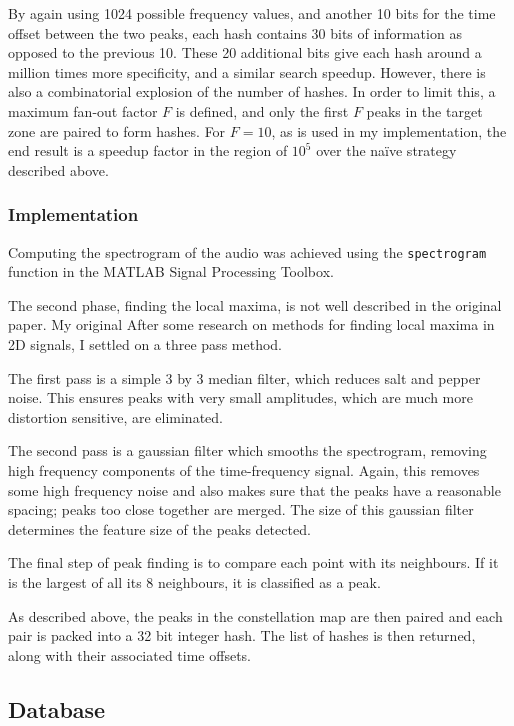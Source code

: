 \documentclass[12pt,a4paper,twoside,openright]{report}
\begin{document}
By again using 1024 possible frequency values, and another 10 bits for the time offset between the two peaks, each hash contains 30 bits of information as opposed to the previous 10. These 20 additional bits give each hash around a million times more specificity, and a similar search speedup. However, there is also a combinatorial explosion of the number of hashes. In order to limit this, a maximum fan-out factor $F$ is defined, and only the first $F$ peaks in the target zone are paired to form hashes. For $F=10$, as is used in my implementation, the end result is a speedup factor in the region of $10^5$ over the na{\"i}ve strategy described above.

\subsubsection{Implementation}

Computing the spectrogram of the audio was achieved using the \lstinline{spectrogram} function in the MATLAB Signal Processing Toolbox.

The second phase, finding the local maxima, is not well described in the original paper. My original After some research on methods for finding local maxima in 2D signals, I settled on a three pass method. 

The first pass is a simple 3 by 3 median filter, which reduces salt and pepper noise. This ensures peaks with very small amplitudes, which are much more distortion sensitive, are eliminated. 

The second pass is a gaussian filter which smooths the spectrogram, removing high frequency components of the time-frequency signal. Again, this removes some high frequency noise and also makes sure that the peaks have a reasonable spacing; peaks too close together are merged. The size of this gaussian filter determines the feature size of the peaks detected. 

The final step of peak finding is to compare each point with its neighbours. If it is the largest of all its 8 neighbours, it is classified as a peak.

As described above, the peaks in the constellation map are then paired and each pair is packed into a 32 bit integer hash. The list of hashes is then returned, along with their associated time offsets.


\subsection{Database}
\label{shazam:db}
\end{document}
